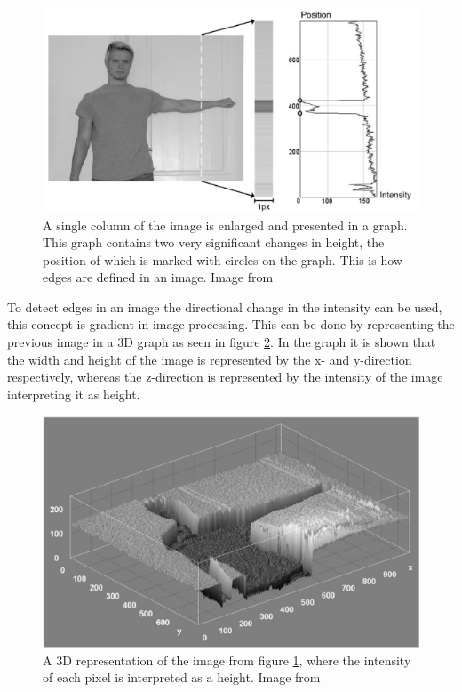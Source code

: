 \begin{figure}[H]  %
	\centering
	\includegraphics[width=1\textwidth]{8Misc/Pictures/Introduction/edge_pixel.png}
	\caption{A single column of the image is enlarged and presented in a graph. This graph contains
two very significant changes in height, the position of which is marked with circles on the graph.
This is how edges are defined in an image. Image from \citep[ Chapter~5.2.2]{book:Moeslund}}
	\label{fig: edge_pixel}
\end{figure}

To detect edges in an image the directional change in the intensity can be used, this concept is gradient in image processing. This can be done by representing the previous image in a 3D graph as seen in figure \ref{fig: edge_3d}. In the graph it is shown that the width and height of the image is represented by the x- and y-direction respectively, whereas the z-direction is represented by the intensity of the image interpreting it as height. 

\begin{figure}[H]  %
	\centering
	\includegraphics[width=1\textwidth]{8Misc/Pictures/Introduction/edge_3d.png}
	\caption{A 3D representation of the image from figure \ref{fig: edge_pixel}, where the intensity of each pixel is interpreted as a height. Image from \citep[ Chapter~5.2.2]{book:Moeslund}}
	\label{fig: edge_3d}
\end{figure}

